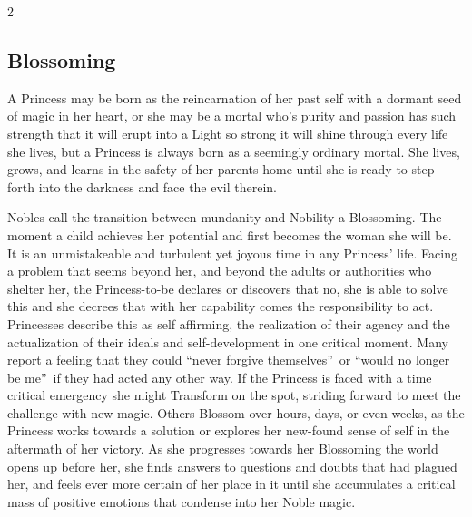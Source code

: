 \begin{multicols}{2}
\subsection*{Blossoming}

A Princess may be born as the reincarnation of her past self with a dormant seed of magic in her heart, or she may be a mortal who's purity and passion has such strength that it will erupt into a Light so strong it will shine through every life she lives, but a Princess is always born as a seemingly ordinary mortal. She lives, grows, and learns in the safety of her parents home until she is ready to step forth into the darkness and face the evil therein. 

Nobles call the transition between mundanity and Nobility a Blossoming. The moment a child achieves her potential and first becomes the woman she will be. It is an unmistakeable and turbulent yet joyous time in any Princess' life. Facing a problem that seems beyond her, and beyond the adults or authorities who shelter her, the Princess-to-be declares or discovers that no, she is able to solve this and she decrees that with her capability comes the responsibility to act. Princesses describe this as self affirming, the realization of their agency and the actualization of their ideals and self-development in one critical moment. Many report a feeling that they could \textquotedblleft never forgive themselves\textquotedblright\, or \textquotedblleft would no longer be me\textquotedblright\, if they had acted any other way. If the Princess is faced with a time critical emergency she might Transform on the spot, striding forward to meet the challenge with new magic. Others Blossom over hours, days, or even weeks, as the Princess works towards a solution or explores her new-found sense of self in the aftermath of her victory. As she progresses towards her Blossoming the world opens up before her, she finds answers to questions and doubts that had plagued her, and feels ever more certain of her place in it until she accumulates a critical mass of positive emotions that condense into her Noble magic.


\end{multicols}
